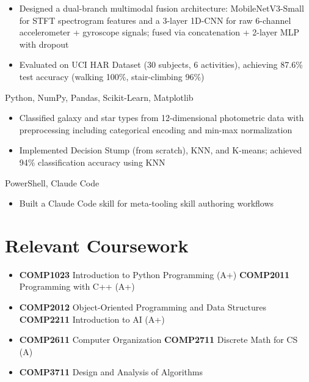 \documentclass{common/resume}
\begin{document}
\begin{itemize}
  \item Designed a dual-branch multimodal fusion architecture: MobileNetV3-Small for STFT spectrogram features and a 3-layer 1D-CNN for raw 6-channel accelerometer + gyroscope signals; fused via concatenation + 2-layer MLP with dropout
  \item Evaluated on UCI HAR Dataset (30 subjects, 6 activities), achieving 87.6\% test accuracy (walking 100\%, stair-climbing 96\%)
\end{itemize}

  {Python, NumPy, Pandas, Scikit-Learn, Matplotlib}

\begin{itemize}
  \item Classified galaxy and star types from 12-dimensional photometric data with preprocessing including categorical encoding and min-max normalization
  \item Implemented Decision Stump (from scratch), KNN, and K-means; achieved 94\% classification accuracy using KNN
\end{itemize}

  {PowerShell, Claude Code}

\begin{itemize}
  \item Built a Claude Code skill for meta-tooling skill authoring workflows
\end{itemize}

\section{Relevant Coursework}

\begin{itemize}
  \item \textbf{COMP1023} Introduction to Python Programming (A+) \hfill \textbf{COMP2011} Programming with C++ (A+)
  \item \textbf{COMP2012} Object-Oriented Programming and Data Structures \hfill \textbf{COMP2211} Introduction to AI (A+)
  \item \textbf{COMP2611} Computer Organization \hfill \textbf{COMP2711} Discrete Math for CS (A)
  \item \textbf{COMP3711} Design and Analysis of Algorithms
\end{itemize}
\end{document}
